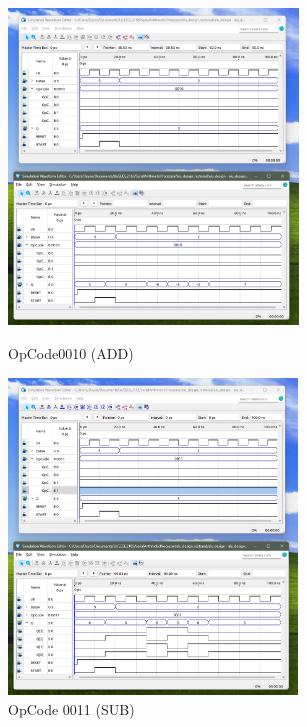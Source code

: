 \documentclass[11pt,a4paper,english]{article}
\begin{document}
    \begin{figure}[h]
        \begin{minipage}[c]{0.4\linewidth}
        \centering
        \includegraphics[height=84mm]{./ss/p4_add(0010).png}
        \caption{OpCode0010 (ADD)}
        \end{minipage}
        \hspace*{50pt}
        \begin{minipage}[c]{0.4\linewidth}
        \centering
        \includegraphics[height=84mm]{./ss/p4_sub(0011).png}
        \caption{OpCode 0011 (SUB)}
        \end{minipage}%
    \end{figure}
\end{document}
